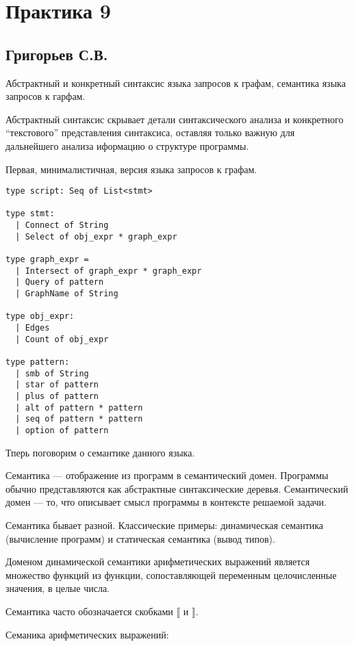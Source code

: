 \section{Практика 9}

\subsection{Григорьев С.В.}

Абстрактный и конкретный синтаксис языка запросов к графам, семантика языка запросов к гарфам.

Абстрактный синтаксис скрывает детали синтаксического анализа и конкретного ``текстового'' представления синтаксиса, оставляя только важную для дальнейшего анализа иформацию о структуре программы.

Первая, минималистичная, версия языка запросов к графам.

\begin{verbatim}
type script: Seq of List<stmt>

type stmt:
  | Connect of String
  | Select of obj_expr * graph_expr

type graph_expr =
  | Intersect of graph_expr * graph_expr
  | Query of pattern
  | GraphName of String

type obj_expr:
  | Edges
  | Count of obj_expr

type pattern:
  | smb of String
  | star of pattern
  | plus of pattern
  | alt of pattern * pattern
  | seq of pattern * pattern
  | option of pattern

\end{verbatim}

\newcommand{\sem}[1]{\llbracket #1 \rrbracket}

Тперь поговорим о семантике данного языка.

Семантика --- отображение из программ в семантический домен.
Программы обычно представляются как абстрактные синтаксические деревья.
Семантический домен --- то, что описывает смысл программы в контексте решаемой задачи.

Семантика бывает разной.
Классические примеры: динамическая семантика (вычисление программ) и статическая семантика (вывод типов).

Доменом динамической семантики арифметических выражений является множество функций из функции, сопоставляющей переменным целочисленные значения, в целые числа.

Семантика часто обозначается скобками $\llbracket$ и $\rrbracket$.

Семаника арифметических выражений:

